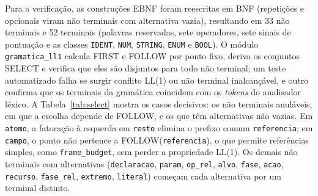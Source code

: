 \documentclass[conference]{IEEEtran}
\begin{document}
Para a verificação, as construções EBNF foram reescritas em BNF (repetições e
opcionais viram não terminais com alternativa vazia), resultando em 33 não
terminais e 52 terminais (palavras reservadas, sete operadores, sete sinais de
pontuação e as classes \texttt{IDENT}, \texttt{NUM}, \texttt{STRING},
\texttt{ENUM} e \texttt{BOOL}). O módulo \texttt{gramatica\_ll1} calcula FIRST e
FOLLOW por ponto fixo, deriva os conjuntos SELECT e verifica que eles são
disjuntos para todo não terminal; um teste automatizado falha se surgir
conflito LL(1) ou não terminal inalcançável, e outro confirma que os terminais
da gramática coincidem com os \textit{tokens} do analisador léxico. A
Tabela~\ref{tab:select} mostra os casos decisivos: os não terminais anuláveis,
em que a escolha depende de FOLLOW, e os que têm alternativas não vazias. Em
\texttt{atomo}, a fatoração à esquerda em \texttt{resto} elimina o prefixo
comum \texttt{referencia}; em \texttt{campo}, o ponto não pertence a
FOLLOW(\texttt{referencia}), o que permite referências simples, como
\texttt{frame\_budget}, sem perder a propriedade LL(1). Os demais não terminais
com alternativas (\texttt{declaracao}, \texttt{param}, \texttt{op\_rel},
\texttt{alvo}, \texttt{fase}, \texttt{acao}, \texttt{recurso},
\texttt{fase\_rel}, \texttt{extremo}, \texttt{literal}) começam cada
alternativa por um terminal distinto.
\end{document}
